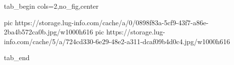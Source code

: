  
 
 
 
 


\ifcmt
  tab_begin cols=2,no_fig,center

     pic https://storage.lug-info.com/cache/a/0/0898f83a-5cf9-43f7-a86e-2ba4b572ca0b.jpg/w1000h616%
		 pic https://storage.lug-info.com/cache/5/a/724cd330-6e29-48e2-a311-dcaf09b4d0c4.jpg/w1000h616%

  tab_end
\fi
